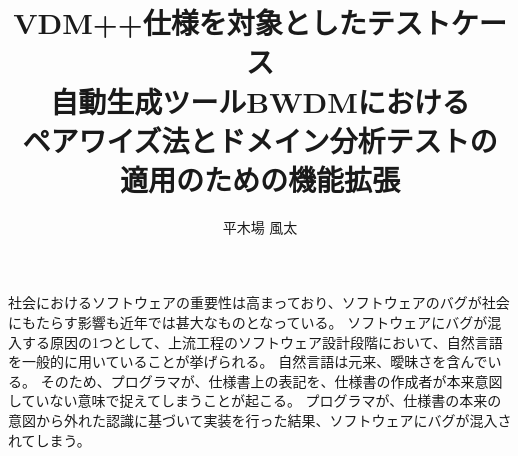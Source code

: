 \documentclass[uplatex, report, a4j, 10pt]{jsbook}
\title{VDM++仕様を対象としたテストケース \\ 自動生成ツールBWDMにおける \\ ペアワイズ法とドメイン分析テストの \\ 適用のための機能拡張}
\author{平木場 風太}
\begin{document}
\maketitle

社会におけるソフトウェアの重要性は高まっており、ソフトウェアのバグが社会にもたらす影響も近年では甚大なものとなっている。
ソフトウェアにバグが混入する原因の1つとして、上流工程のソフトウェア設計段階において、自然言語を一般的に用いていることが挙げられる。
自然言語は元来、曖昧さを含んでいる。
そのため、プログラマが、仕様書上の表記を、仕様書の作成者が本来意図していない意味で捉えてしまうことが起こる。
プログラマが、仕様書の本来の意図から外れた認識に基づいて実装を行った結果、ソフトウェアにバグが混入されてしまう。
\end{document}
